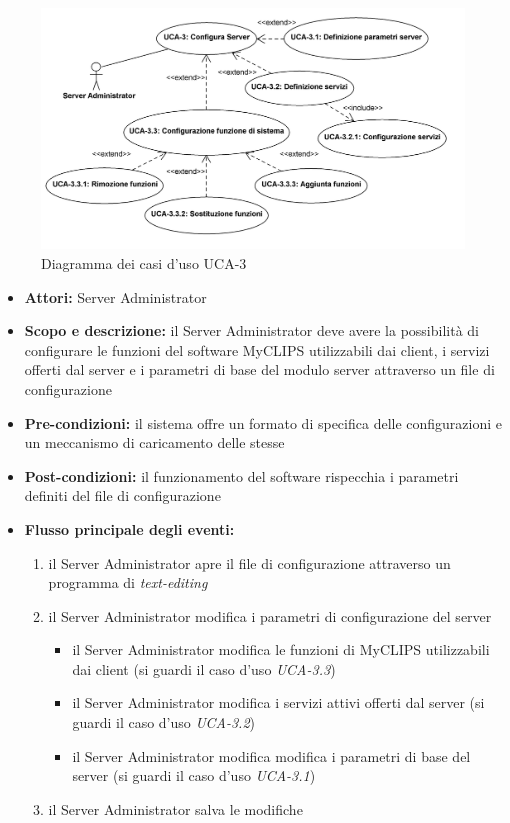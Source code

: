 
\begin{figure}
\centering
\includegraphics[width=1.1\textwidth]{Immagini/Capitolo2/UseCases/UCA-3.png}
\caption{Diagramma dei casi d'uso UCA-3}\label{fig:uc-uca-3}
\end{figure}

\begin{itemize}
	\item \textbf{Attori:} Server Administrator
	\item \textbf{Scopo e descrizione:} il Server Administrator deve avere la possibilità di configurare le funzioni del software MyCLIPS utilizzabili dai client, i servizi offerti dal server e i parametri di base del modulo server attraverso un file di configurazione
	\item \textbf{Pre-condizioni:} il sistema offre un formato di specifica delle configurazioni e un meccanismo di caricamento delle stesse
	\item \textbf{Post-condizioni:} il funzionamento del software rispecchia i parametri definiti del file di configurazione
	\item \textbf{Flusso principale degli eventi:}
		\begin{enumerate}
			\item il Server Administrator apre il file di configurazione attraverso un programma di \emph{text-editing}
			\item il Server Administrator modifica i parametri di configurazione del server
				\begin{itemize}
					\item il Server Administrator modifica le funzioni di MyCLIPS utilizzabili dai client (si guardi il caso d'uso \emph{UCA-3.3})
					\item il Server Administrator modifica i servizi attivi offerti dal server (si guardi il caso d'uso \emph{UCA-3.2})
					\item il Server Administrator modifica modifica i parametri di base del server (si guardi il caso d'uso \emph{UCA-3.1})
				\end{itemize}
			\item il Server Administrator salva le modifiche
		\end{enumerate}
\end{itemize}


